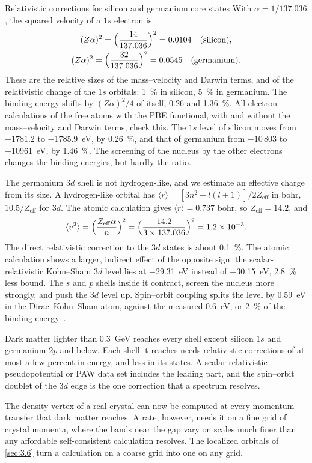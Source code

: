 \begin{workedexample}{Relativistic corrections for silicon and germanium core states}\label{we:3-Zalpha}
With $\alpha = 1/137.036$, the squared velocity of a $1s$ electron is
\begin{gather*}
  (Z\alpha)^2 = \Bigl(\frac{14}{137.036}\Bigr)^2 = 0.0104 \quad\text{(silicon)}, \\
  (Z\alpha)^2 = \Bigl(\frac{32}{137.036}\Bigr)^2 = 0.0545 \quad\text{(germanium)}.
\end{gather*}
These are the relative sizes of the mass--velocity and Darwin terms, and of the relativistic change of the $1s$ orbitals: \SI{1}{\percent} in silicon, \SI{5}{\percent} in germanium. The binding energy shifts by $(Z\alpha)^2/4$ of itself, 0.26 and \SI{1.36}{\percent}. All-electron calculations of the free atoms with the PBE functional, with and without the mass--velocity and Darwin terms, check this. The $1s$ level of silicon moves from $-1781.2$ to \SI{-1785.9}{eV}, by \SI{0.26}{\percent}, and that of germanium from $-10\,803$ to \SI{-10961}{eV}, by \SI{1.46}{\percent}. The screening of the nucleus by the other electrons changes the binding energies, but hardly the ratio.

The germanium $3d$ shell is not hydrogen-like, and we estimate an effective charge from its size. A hydrogen-like orbital has $\langle r\rangle = [3n^2 - l(l + 1)]/2Z_{\mathrm{eff}}$ in bohr, $10.5/Z_{\mathrm{eff}}$ for $3d$. The atomic calculation gives $\langle r\rangle = 0.737$ bohr, so $Z_{\mathrm{eff}} = 14.2$, and
\begin{equation*}
  \langle v^2\rangle = \Bigl(\frac{Z_{\mathrm{eff}}\alpha}{n}\Bigr)^2 = \Bigl(\frac{14.2}{3\times137.036}\Bigr)^2 = 1.2\times10^{-3} .
\end{equation*}
The direct relativistic correction to the $3d$ states is about \SI{0.1}{\percent}. The atomic calculation shows a larger, indirect effect of the opposite sign: the scalar-relativistic Kohn--Sham $3d$ level lies at \SI{-29.31}{eV} instead of \SI{-30.15}{eV}, \SI{2.8}{\percent} less bound. The $s$ and $p$ shells inside it contract, screen the nucleus more strongly, and push the $3d$ level up. Spin--orbit coupling splits the level by \SI{0.59}{eV} in the Dirac--Kohn--Sham atom, against the measured \SI{0.6}{eV}, or \SI{2}{\percent} of the binding energy~\cite[Table~1-1]{williams2009electron}.

Dark matter lighter than \SI{0.3}{GeV} reaches every shell except silicon $1s$ and germanium $2p$ and below. Each shell it reaches needs relativistic corrections of at most a few percent in energy, and less in its states. A scalar-relativistic pseudopotential or PAW data set includes the leading part, and the spin--orbit doublet of the $3d$ edge is the one correction that a spectrum resolves.
\end{workedexample}

The density vertex of a real crystal can now be computed at every momentum transfer that dark matter reaches. A rate, however, needs it on a fine grid of crystal momenta, where the bands near the gap vary on scales much finer than any affordable self-consistent calculation resolves. The localized orbitals of \cref{sec:3.6} turn a calculation on a coarse grid into one on any grid.
